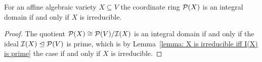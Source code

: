 \begin{corollary}
  For an affine algebraic variety $X \subseteq V$ the coordinate ring $\mathcal{P}(X)$ is an integral domain if and only if $X$ is irreducible.
\end{corollary}


\begin{proof}
  The quotient $\mathcal{P}(X) \cong \mathcal{P}(V)/\mathcal{I}(X)$ is an integral domain if and only if the ideal $\mathcal{I}(X) \trianglelefteq \mathcal{P}(V)$ is prime, which is by Lemma~\ref{lemma: X is irreducible iff I(X) is prime} the case if and only if $X$ is irreducible.
\end{proof}







